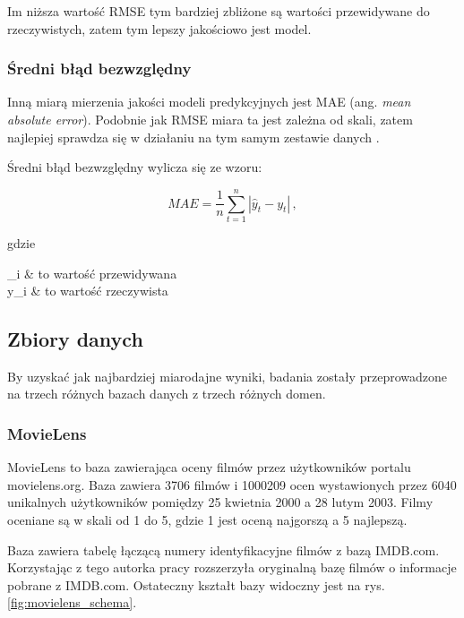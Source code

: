 \documentclass[twoside]{iisthesis}
\begin{document}
		Im niższa wartość RMSE tym bardziej zbliżone są wartości przewidywane do rzeczywistych, zatem tym lepszy jakościowo jest model. 
		
		\subsubsection{Średni błąd bezwzględny}
		
		Inną miarą mierzenia jakości modeli predykcyjnych jest MAE (ang. \textit{mean absolute error}). Podobnie jak RMSE miara ta jest zależna od skali, zatem najlepiej sprawdza się w działaniu na tym samym zestawie danych \cite{hyndman2006another}. 
		
		Średni błąd bezwzględny wylicza się ze wzoru:
		
		\begin{equation}
		\label{eq:mae}
		MAE = \frac{1}{n} \sum_{t=1}^{n} |\hat{y}_t - y_t|
		\,,
		\end{equation}
		
		gdzie
		
		\begin{conditions*}
			_i & to wartość przewidywana \\
			y_i  &  to wartość rzeczywista
		\end{conditions*} 
	
	
		\subsection{Zbiory danych}
		
		By uzyskać jak najbardziej miarodajne wyniki, badania zostały przeprowadzone na trzech różnych bazach danych z trzech różnych domen. 
		
		\subsubsection{MovieLens}
		MovieLens \cite{harper2016movielens} to baza zawierająca oceny filmów przez użytkowników portalu movielens.org. Baza zawiera 3706 filmów i 1000209 ocen wystawionych przez 6040 unikalnych użytkowników pomiędzy 25 kwietnia 2000 a 28 lutym 2003. Filmy oceniane są w skali od 1 do 5, gdzie 1 jest oceną najgorszą a 5 najlepszą. 
		
		Baza zawiera tabelę łączącą numery identyfikacyjne filmów z bazą IMDB.com. Korzystając z tego autorka pracy rozszerzyła oryginalną bazę filmów o informacje pobrane z IMDB.com. Ostateczny kształt bazy widoczny jest na rys. \ref{fig:movielens_schema}.
		
\end{document}
